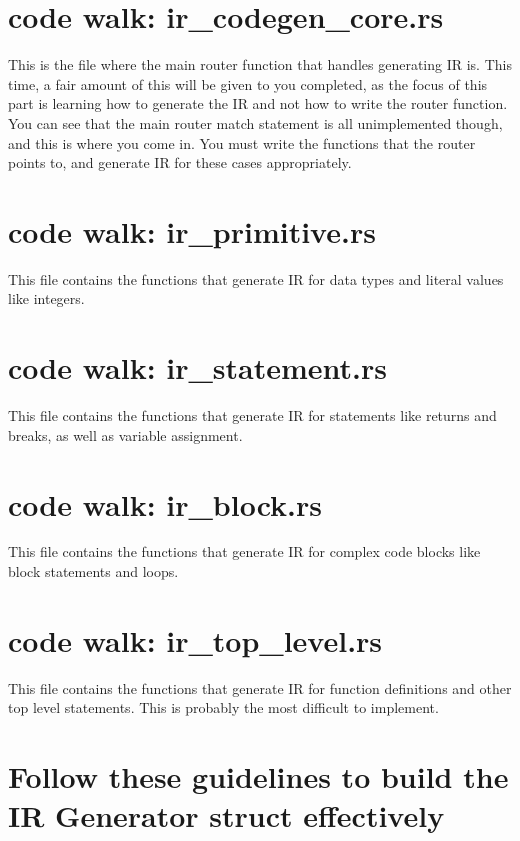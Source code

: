 \documentclass[
	12pt, %
]{fphw}
\begin{document}
\section*{code walk: ir\_codegen\_core.rs}
This is the file where the main router function that handles generating IR is. This time, a fair amount of this will be given to you completed, as the focus of this part is learning how to generate the IR and not how to write the router function. You can see that the main router match statement is all unimplemented though, and this is where you come in. You must write the functions that the router points to, and generate IR for these cases appropriately. 

\section*{code walk: ir\_primitive.rs}
This file contains the functions that generate IR for data types and literal values like integers.

\section*{code walk: ir\_statement.rs}
This file contains the functions that generate IR for statements like returns and breaks, as well as variable assignment.

\section*{code walk: ir\_block.rs}
This file contains the functions that generate IR for complex code blocks like block statements and loops.

\section*{code walk: ir\_top\_level.rs}
This file contains the functions that generate IR for function definitions and other top level statements. This is probably the most difficult to implement.


\pagebreak

\section*{Follow these guidelines to build the IR Generator struct effectively}
\end{document}
